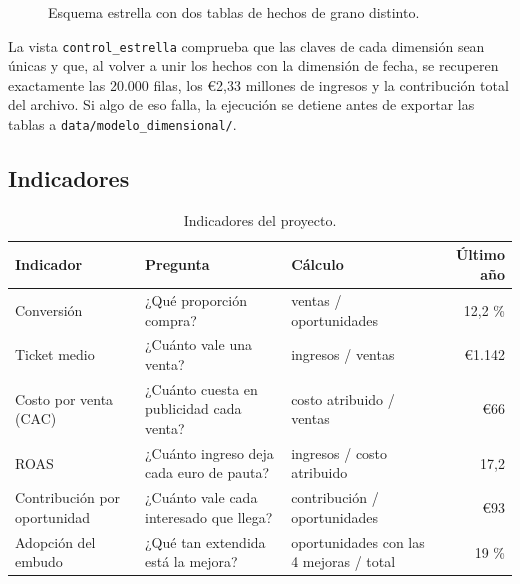 \documentclass[11pt,letterpaper]{article}
\begin{document}
\begin{figure}[!htbp]
\centering
{}
\caption{Esquema estrella con dos tablas de hechos de grano distinto.}
\label{fig:estrella}
\end{figure}

La vista \texttt{control\_estrella} comprueba que las claves de cada dimensión sean únicas y que, al volver a
unir los hechos con la dimensión de fecha, se recuperen exactamente las 20.000 filas, los €2,33 millones de
ingresos y la contribución total del archivo. Si algo de eso falla, la ejecución se detiene antes de exportar
las tablas a \texttt{data/modelo\_dimensional/}.

\subsection{Indicadores}

\begin{table}[!htbp]
\centering
\caption{Indicadores del proyecto.}
\begin{tabularx}{\linewidth}{l L L r}
\toprule
Indicador & Pregunta & Cálculo & Último año \\
\midrule
Conversión & ¿Qué proporción compra? & ventas / oportunidades & 12,2 \% \\
Ticket medio & ¿Cuánto vale una venta? & ingresos / ventas & €1.142 \\
Costo por venta (CAC) & ¿Cuánto cuesta en publicidad cada venta? & costo atribuido / ventas & €66 \\
ROAS & ¿Cuánto ingreso deja cada euro de pauta? & ingresos / costo atribuido & 17,2 \\
Contribución por oportunidad & ¿Cuánto vale cada interesado que llega? & contribución / oportunidades & €93 \\
Adopción del embudo & ¿Qué tan extendida está la mejora? & oportunidades con las 4 mejoras / total & 19 \% \\
\bottomrule
\end{tabularx}
\end{table}
\end{document}
